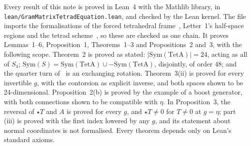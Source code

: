 \documentclass[twocolumn]{iopjournal}
\theoremstyle{definition}
\theoremstyle{remark}
\begin{document}
Every result of this note is proved in Lean~4 with the Mathlib library,
in \texttt{lean/GramMatrixTetradEquation.lean}, and checked by the Lean
kernel. The file imports the formalisations of the forced tetrahedral
frame~\cite{NelsonForced}, Letter~1's half-space regions and the tetrad
scheme~\cite{NelsonScheme}, so these are checked as one chain. It proves
Lemmas~1--6, Proposition~1, Theorems~1--3 and Propositions~2 and~3, with
the following scope. Theorem~2 is proved as stated: $|\mathrm{Sym}(\mathrm{TetA})| = 24$,
acting as all of $S_4$; $\mathrm{Sym}(S) = \mathrm{Sym}(\mathrm{TetA})\cup
-\mathrm{Sym}(\mathrm{TetA})$, disjointly, of order 48; and the quarter turn of~\cite{NelsonScheme}
is an exchanging rotation. Theorem~3(ii) is proved for every invertible
$g$, with the contorsion as explicit inverse, and both spaces shown to be
24-dimensional. Proposition~2(b) is proved by the example of a boost
generator, with both connections shown to be compatible with $\eta$.
In Proposition~3, the reversal of $\star T$ and $A$ is proved for every
$g$, and $\star T \neq 0$ for $T \neq 0$ at $g = \eta$; part (iii) is
proved with the first index lowered by any $g$, and its statement about
normal coordinates is not formalised. Every theorem depends only on
Lean's standard axioms.
\end{document}
